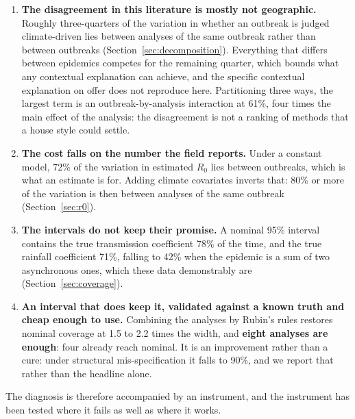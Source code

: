 \documentclass[11pt,a4paper]{article}
\begin{document}
\begin{enumerate}
\item \textbf{The disagreement in this literature is mostly not geographic.}
      Roughly three-quarters of the variation in whether an outbreak is judged
      climate-driven lies between analyses of the same outbreak rather than
      between outbreaks (Section~\ref{sec:decomposition}). Everything that differs
      between epidemics competes for the remaining quarter, which bounds what any
      contextual explanation can achieve, and the specific contextual
      explanation on offer does not reproduce here. Partitioning three ways, the
      largest term is an outbreak-by-analysis interaction at 61\%, four times the
      main effect of the analysis: the disagreement is not a ranking of methods
      that a house style could settle.
\item \textbf{The cost falls on the number the field reports.} Under a constant
      model, 72\% of the variation in estimated $R_0$ lies between outbreaks,
      which is what an estimate is for. Adding climate covariates inverts that:
      80\% or more of the variation is then between analyses of the same outbreak
      (Section~\ref{sec:r0}).
\item \textbf{The intervals do not keep their promise.} A nominal 95\% interval
      contains the true transmission coefficient 78\% of the time, and the true
      rainfall coefficient 71\%, falling to 42\% when the epidemic is a sum of two
      asynchronous ones, which these data demonstrably are
      (Section~\ref{sec:coverage}).
\item \textbf{An interval that does keep it, validated against a known truth and
      cheap enough to use.} Combining the analyses by Rubin's rules restores
      nominal coverage at 1.5 to 2.2 times the width, and \textbf{eight analyses
      are enough}: four already reach nominal. It is an improvement rather than
      a cure: under structural mis-specification it falls to 90\%, and we report
      that rather than the headline alone.
\end{enumerate}

The diagnosis is therefore accompanied by an instrument, and the instrument has
been tested where it fails as well as where it works.
\end{document}

